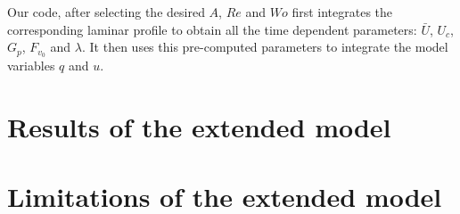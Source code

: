 \documentclass{article}
\begin{document}
Our code, after selecting the desired $A$, $Re$ and $Wo$ first integrates the corresponding laminar profile to obtain all the time dependent parameters: $\bar{U}$, $U_{c}$, $G_{p}$, $F_{v_{0}}$ and $\lambda$. It then uses this pre-computed parameters to integrate the model variables $q$ and $u$.






\section{Results of the extended model}






\section{Limitations of the extended model}










\end{document}
